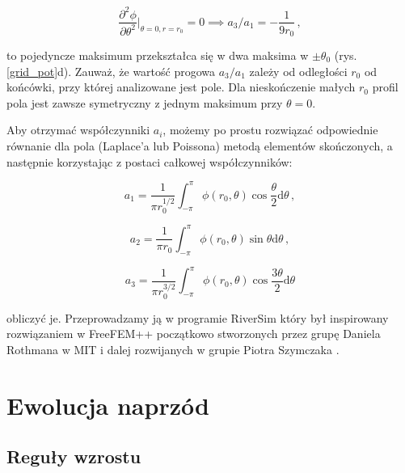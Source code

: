 \documentclass[]{pracamgr}
\begin{document}
    \begin{equation}\label{a3a1}
      \frac{\partial^2 \phi}{\partial \theta^2}\big|_{\theta=0, r=r_0} = 0 \implies a_3/a_1 = -\frac{1}{9 r_0} \,, 
    \end{equation}
    
    to pojedyncze maksimum przekształca się w dwa maksima w $\pm \theta_0$ (rys. \ref{grid_pot}d). Zauważ, że wartość progowa $a_3/a_1$ zależy od odległości $r_0$ od końcówki, przy której analizowane jest pole. Dla nieskończenie małych $r_0$ profil pola jest zawsze symetryczny z jednym maksimum przy $\theta=0$.

    Aby otrzymać współczynniki $a_i$, możemy po prostu rozwiązać odpowiednie równanie dla pola (Laplace'a lub Poissona) metodą elementów skończonych, a następnie korzystając z postaci całkowej współczynników:
    
    \begin{equation}\label{a1}
      a_1 = \frac{1}{\pi r_0^{1/2}}\int^{\pi}_{-\pi} \phi(r_0,\theta)\cos\frac{\theta}{2}\textrm{d}\theta \,,
    \end{equation} 
    
    \begin{equation}\label{a2}
      a_2 = \frac{1}{\pi r_0}\int^{\pi}_{-\pi} \phi(r_0,\theta)\sin\theta \textrm{d}\theta \,,
    \end{equation}
    
    \begin{equation}\label{a3}
      a_3 = \frac{1}{\pi r_0^{3/2}}\int^{\pi}_{-\pi} \phi(r_0,\theta)\cos\frac{3\theta}{2}\textrm{d}\theta
    \end{equation}	
    
    obliczyć je. Przeprowadzamy ją w programie RiverSim który był inspirowany rozwiązaniem w FreeFEM++\cite{hecht2012new} początkowo stworzonych przez grupę Daniela Rothmana w MIT \cite{petroff2011geometry, petroff2013bifurcation, cohen2015path} i dalej rozwijanych w grupie Piotra Szymczaka \cite{morawiecki2016problem, zukowski2019zwiazek}.



  \chapter{Ewolucja naprzód}
    
    \section{Reguły wzrostu}
\end{document}

